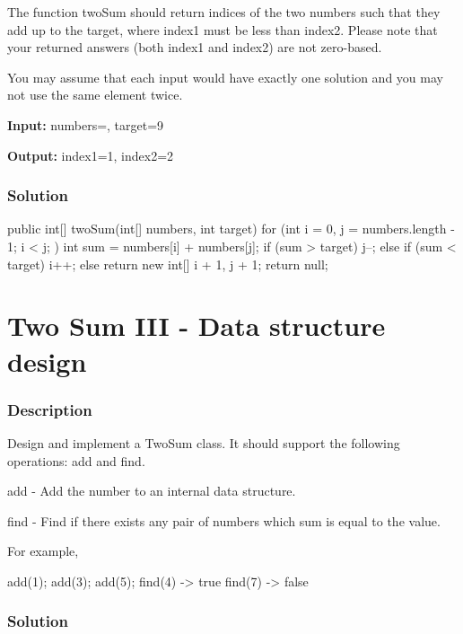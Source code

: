 The function twoSum should return indices of the two numbers such that they add up to the target, where index1 must be less than index2. Please note that your returned answers (both index1 and index2) are not zero-based.

You may assume that each input would have exactly one solution and you may not use the same element twice.

\textbf{Input:} numbers=, target=9

\textbf{Output:} index1=1, index2=2

\subsubsection{Solution}

\begin{Code}
public int[] twoSum(int[] numbers, int target) {
    for (int i = 0, j = numbers.length - 1; i < j; ) {
        int sum = numbers[i] + numbers[j];
        if (sum > target) {
            j--;
        } else if (sum < target) {
            i++;
        } else {
            return new int[] {i + 1, j + 1};
        }
    }
    return null;
}
\end{Code}

\newpage

\section{Two Sum III - Data structure design} %

\subsubsection{Description}
Design and implement a TwoSum class. It should support the following operations: add and find.

add - Add the number to an internal data structure.

find - Find if there exists any pair of numbers which sum is equal to the value.

For example,
\begin{Code}
add(1); add(3); add(5);
find(4) -> true
find(7) -> false
\end{Code}

\subsubsection{Solution}

